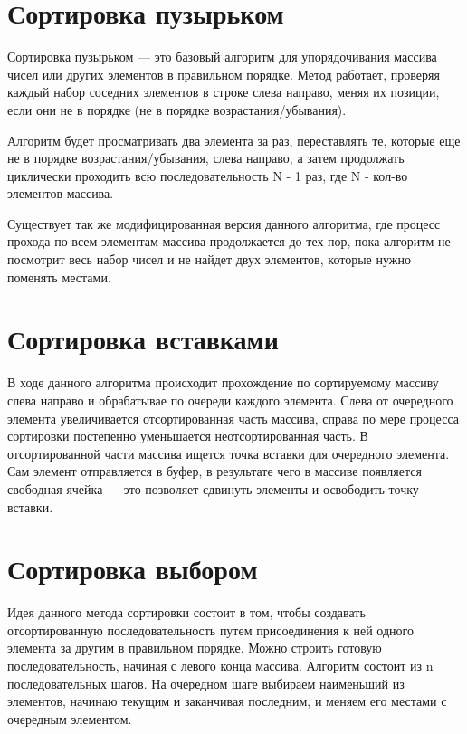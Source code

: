 \documentclass[a4paper,12pt]{report}
\begin{document}
	
	\section{Сортировка пузырьком}
	
	 Сортировка пузырьком — это базовый алгоритм для упорядочивания массива чисел или других элементов в правильном порядке. Метод работает, проверяя каждый набор соседних элементов в строке слева направо, меняя их позиции, если они не в порядке (не в порядке возрастания/убывания). 
	 
	 Алгоритм будет просматривать два элемента за раз, переставлять те, которые еще не в порядке возрастания/убывания, слева направо, а затем продолжать циклически проходить всю последовательность N - 1 раз, где N - кол-во элементов массива. 
	 
	 Существует так же модифицированная версия данного алгоритма, где процесс прохода по всем элементам массива продолжается до тех пор, пока алгоритм не посмотрит весь набор чисел и не найдет двух элементов, которые нужно поменять местами.
	
	\section{Сортировка вставками}
	
	В ходе данного алгоритма происходит прохождение по сортируемому массиву слева направо и обрабатывае по очереди каждого элемента. Слева от очередного элемента увеличивается отсортированная часть массива, справа по мере процесса сортировки постепенно уменьшается неотсортированная часть. В отсортированной части массива ищется точка вставки для очередного элемента. Сам элемент отправляется в буфер, в результате чего в массиве появляется свободная ячейка — это позволяет сдвинуть элементы и освободить точку вставки.
	
	\section{Сортировка выбором}
	
	Идея данного метода сортировки состоит в том, чтобы создавать отсортированную последовательность путем присоединения к ней одного элемента за другим в правильном порядке. Можно строить готовую последовательность, начиная с левого конца массива. Алгоритм состоит из n последовательных шагов. На очередном шаге выбираем наименьший из элементов, начинаю текущим и заканчивая последним, и меняем его местами с очередным элементом.
	
\end{document}
